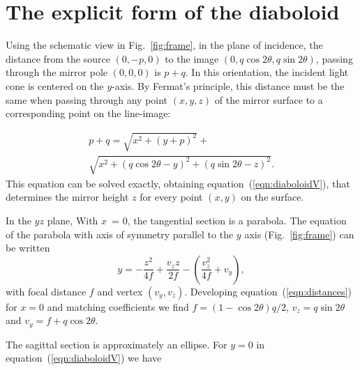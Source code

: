 \documentclass[preprint]{iucr}       %
\begin{document}
\appendix

\section{The explicit form of the diaboloid }
\label{appendix:diaboloid}

Using the schematic view in Fig.~\ref{fig:frame}, in the plane of incidence, the distance from the source $(0,-p,0)$ to the image $(0,q \cos2\theta, q \sin2\theta)$, passing through the mirror pole $(0,0,0)$ is $p+q$. In this orientation, the incident light cone is centered on the $y$-axis. By Fermat's principle, this distance must be the same when passing through any point $(x,y,z)$ of the mirror surface to a corresponding point on the line-image:

\begin{multline}
\label{eqn:distances}
p + q = 
\sqrt{x^2 + (y + p)^2} + \\
\sqrt{x^2 + (q \cos2 \theta - y)^2 + (q \sin2 \theta - z)^2}.
\end{multline}
This equation can be solved exactly, obtaining equation~(\ref{eqn:diaboloidV}), that determines the mirror height $z$ for every point $(x,y)$ on the surface.

In the $yz$ plane, With $x$~= 0, the tangential section is a parabola. The equation of the parabola with axis of symmetry parallel to the $y$ axis (Fig.~\ref{fig:frame}) can be written 
\begin{equation}
y = -\frac{z^2}{4 f} + \frac{v_z z}{2 f} - \left(\frac{v_z^2}{4 f} + v_y\right),
\end{equation}
\noindent with focal distance $f$ and vertex $(v_y,v_z)$. Developing equation~(\ref{eqn:distances}) for $x=0$ and matching coefficients we find $f=(1-\cos2\theta)q/2$, $v_z=q \sin2\theta$ and $v_y=f+q\cos2\theta$.

The sagittal section is approximately an ellipse. For $y=0$ in equation~(\ref{eqn:diaboloidV}) we have
\end{document}
